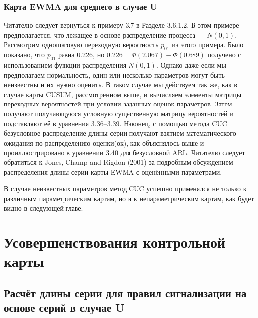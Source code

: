 \subsubsection{Карта EWMA для среднего в случае U}

Читателю следует вернуться к примеру 3.7 в Разделе 3.6.1.2. В этом примере предполагается, что лежащее в основе распределение процесса — \(N(0,1)\). Рассмотрим одношаговую переходную вероятность \(p_{01}\) из этого примера. Было показано, что \(p_{01}\) равна 0.226, но \(0.226 = \Phi(2.067) - \Phi(0.689)\) получено с использованием функции распределения \(N(0,1)\). Однако даже если мы предполагаем нормальность, один или несколько параметров могут быть неизвестны и их нужно оценить. В таком случае мы действуем так же, как в случае карты CUSUM, рассмотренном выше, и вычисляем элементы матрицы переходных вероятностей при условии заданных оценок параметров. Затем получают получающуюся условную существенную матрицу вероятностей и подставляют её в уравнения 3.36–3.39. Наконец, с помощью метода CUC безусловное распределение длины серии получают взятием математического ожидания по распределению оценки(ок), как объяснялось выше и проиллюстрировано в уравнении 3.40 для безусловной ARL. Читателю следует обратиться к Jones, Champ and Rigdon (2001) за подробным обсуждением распределения длины серии карты EWMA с оценёнными параметрами.

В случае неизвестных параметров метод CUC успешно применялся не только к различным параметрическим картам, но и к непараметрическим картам, как будет видно в следующей главе.

\section{Усовершенствования контрольной карты}

\subsection{Расчёт длины серии для правил сигнализации на основе серий в случае U}

